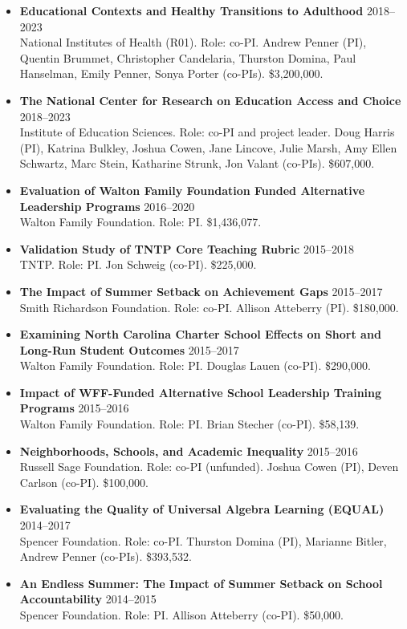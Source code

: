 \documentclass[11pt, letterpaper]{article}
\begin{document}
\begin{itemize}
  Smith Richardson Foundation. Role: co-PI.
Thurston Domina (PI), Deven Carlson and Matthew Lenard (co-PIs). \$208,360.
  \item \textbf{Educational Contexts and Healthy Transitions to Adulthood} \hfill 2018--2023 \\
  National Institutes of Health (R01). Role: co-PI.
Andrew Penner (PI), Quentin Brummet, Christopher Candelaria, Thurston Domina, Paul Hanselman, Emily Penner, Sonya Porter (co-PIs). \$3,200,000.
  \item \textbf{The National Center for Research on Education Access and Choice} \hfill 2018--2023 \\
  Institute of Education Sciences. Role: co-PI and project leader.
Doug Harris (PI), Katrina Bulkley, Joshua Cowen, Jane Lincove, Julie Marsh, Amy Ellen Schwartz, Marc Stein, Katharine Strunk, Jon Valant (co-PIs). \$607,000.
  \item \textbf{Evaluation of Walton Family Foundation Funded Alternative Leadership Programs} \hfill 2016--2020 \\
  Walton Family Foundation. Role: PI.
\$1,436,077.
  \item \textbf{Validation Study of TNTP Core Teaching Rubric} \hfill 2015--2018 \\
  TNTP. Role: PI.
Jon Schweig (co-PI). \$225,000.
  \item \textbf{The Impact of Summer Setback on Achievement Gaps} \hfill 2015--2017 \\
  Smith Richardson Foundation. Role: co-PI.
Allison Atteberry (PI). \$180,000.
  \item \textbf{Examining North Carolina Charter School Effects on Short and Long-Run Student Outcomes} \hfill 2015--2017 \\
  Walton Family Foundation. Role: PI.
Douglas Lauen (co-PI). \$290,000.
  \item \textbf{Impact of WFF-Funded Alternative School Leadership Training Programs} \hfill 2015--2016 \\
  Walton Family Foundation. Role: PI.
Brian Stecher (co-PI). \$58,139.
  \item \textbf{Neighborhoods, Schools, and Academic Inequality} \hfill 2015--2016 \\
  Russell Sage Foundation. Role: co-PI (unfunded).
Joshua Cowen (PI), Deven Carlson (co-PI). \$100,000.
  \item \textbf{Evaluating the Quality of Universal Algebra Learning (EQUAL)} \hfill 2014--2017 \\
  Spencer Foundation. Role: co-PI.
Thurston Domina (PI), Marianne Bitler, Andrew Penner (co-PIs). \$393,532.
  \item \textbf{An Endless Summer: The Impact of Summer Setback on School Accountability} \hfill 2014--2015 \\
  Spencer Foundation. Role: PI.
Allison Atteberry (co-PI). \$50,000.
\end{itemize}
\end{document}
